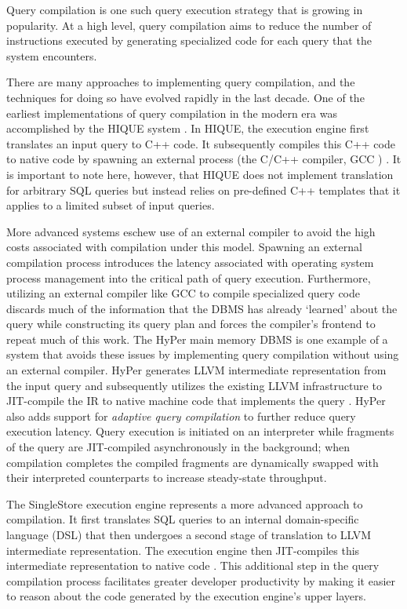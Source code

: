 \documentclass{vldb}
\begin{document}
Query compilation is one such query execution strategy that is growing in popularity. At a high level, query compilation aims to reduce the number of instructions executed by generating specialized code for each query that the system encounters. 

There are many approaches to implementing query compilation, and the techniques for doing so have evolved rapidly in the last decade. One of the earliest implementations of query compilation in the modern era was accomplished by the HIQUE system \cite{systemr}. In HIQUE, the execution engine first translates an input query to C++ code. It subsequently compiles this C++ code to native code by spawning an external process (the C/C++ compiler, GCC \cite{gcc}) \cite{krikellas10}. It is important to note here, however, that HIQUE does not implement translation for arbitrary SQL queries but instead relies on pre-defined C++ templates that it applies to a limited subset of input queries.

More advanced systems eschew use of an external compiler to avoid the high costs associated with compilation under this model. Spawning an external compilation process introduces the latency associated with operating system process management into the critical path of query execution. Furthermore, utilizing an external compiler like GCC to compile specialized query code discards much of the information that the DBMS has already `learned' about the query while constructing its query plan and forces the compiler's frontend to repeat much of this work. The HyPer main memory DBMS \cite{hyper} is one example of a system that avoids these issues by implementing query compilation without using an external compiler. HyPer generates LLVM \cite{llvm} intermediate representation from the input query and subsequently utilizes the existing LLVM infrastructure to JIT-compile the IR to native machine code that implements the query \cite{neumann11, kemper11}. HyPer also adds support for \textit{adaptive query compilation} to further reduce query execution latency. Query execution is initiated on an interpreter while fragments of the query are JIT-compiled asynchronously in the background; when compilation completes the compiled fragments are dynamically swapped with their interpreted counterparts to increase steady-state throughput.

The SingleStore \cite{singlestore} execution engine represents a more advanced approach to compilation. It first translates SQL queries to an internal domain-specific language (DSL) that then undergoes a second stage of translation to LLVM intermediate representation. The execution engine then JIT-compiles this intermediate representation to native code \cite{paroski16}. This additional step in the query compilation process facilitates greater developer productivity by making it easier to reason about the code generated by the execution engine's upper layers.
\end{document}
